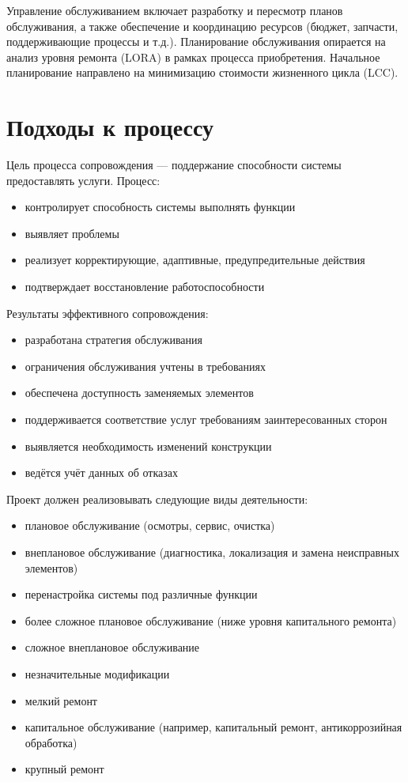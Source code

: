 \documentclass[14pt,a4paper]{extarticle}
\begin{document}
Управление обслуживанием включает разработку и пересмотр планов обслуживания, а также обеспечение и координацию ресурсов (бюджет, запчасти, поддерживающие процессы и т.д.). Планирование обслуживания опирается на анализ уровня ремонта (LORA) в рамках процесса приобретения. Начальное планирование направлено на минимизацию стоимости жизненного цикла (LCC).

\section{Подходы к процессу}

Цель процесса сопровождения — поддержание способности системы предоставлять услуги. Процесс:

\begin{itemize}
\item контролирует способность системы выполнять функции
\item выявляет проблемы
\item реализует корректирующие, адаптивные, предупредительные действия
\item подтверждает восстановление работоспособности
\end{itemize}

Результаты эффективного сопровождения:

\begin{itemize}
\item разработана стратегия обслуживания
\item ограничения обслуживания учтены в требованиях
\item обеспечена доступность заменяемых элементов
\item поддерживается соответствие услуг требованиям заинтересованных сторон
\item выявляется необходимость изменений конструкции
\item ведётся учёт данных об отказах
\end{itemize}

Проект должен реализовывать следующие виды деятельности:

\begin{itemize}
\item плановое обслуживание (осмотры, сервис, очистка)
\item внеплановое обслуживание (диагностика, локализация и замена неисправных элементов)
\item перенастройка системы под различные функции
\item более сложное плановое обслуживание (ниже уровня капитального ремонта)
\item сложное внеплановое обслуживание
\item незначительные модификации
\item мелкий ремонт
\item капитальное обслуживание (например, капитальный ремонт, антикоррозийная обработка)
\item крупный ремонт
\end{itemize}
\end{document}
